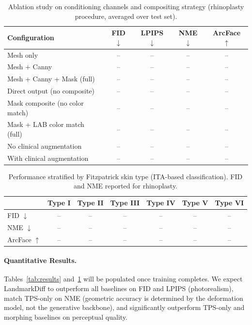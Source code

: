 \documentclass[runningheads]{llncs}
\newcommand{\method}{LandmarkDiff}
\begin{document}
\begin{table}[t]
\centering
\caption{Ablation study on conditioning channels and compositing
strategy (rhinoplasty procedure, averaged over test set).}
\label{tab:ablation}
\small
\begin{tabular}{@{}lcccc@{}}
\toprule
Configuration & FID $\downarrow$ & LPIPS $\downarrow$ & NME $\downarrow$ & ArcFace $\uparrow$ \\
\midrule
Mesh only                   & -- & -- & -- & -- \\
Mesh + Canny                & -- & -- & -- & -- \\
Mesh + Canny + Mask (full)  & -- & -- & -- & -- \\
\midrule
Direct output (no composite)   & -- & -- & -- & -- \\
Mask composite (no color match) & -- & -- & -- & -- \\
Mask + LAB color match (full)   & -- & -- & -- & -- \\
\midrule
No clinical augmentation    & -- & -- & -- & -- \\
With clinical augmentation  & -- & -- & -- & -- \\
\bottomrule
\end{tabular}
\end{table}

\begin{table}[t]
\centering
\caption{Performance stratified by Fitzpatrick skin type (ITA-based
classification). FID and NME reported for rhinoplasty.}
\label{tab:fitzpatrick}
\small
\begin{tabular}{@{}lcccccc@{}}
\toprule
 & Type I & Type II & Type III & Type IV & Type V & Type VI \\
\midrule
FID $\downarrow$        & -- & -- & -- & -- & -- & -- \\
NME $\downarrow$        & -- & -- & -- & -- & -- & -- \\
ArcFace $\uparrow$      & -- & -- & -- & -- & -- & -- \\
\bottomrule
\end{tabular}
\end{table}

\paragraph{Quantitative Results.}
Tables~\ref{tab:results} and~\ref{tab:ablation} will be populated once
training completes.  We expect \method{} to outperform all baselines on
FID and LPIPS (photorealism), match TPS-only on NME (geometric accuracy
is determined by the deformation model, not the generative backbone),
and significantly outperform TPS-only and morphing baselines on perceptual
quality.
\end{document}
